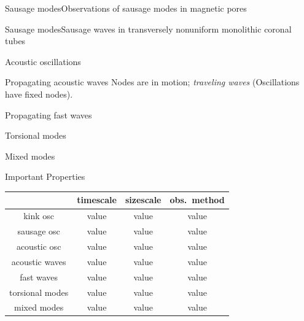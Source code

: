 \documentclass[table]{beamer}
\begin{document}
\begin{frame}{Sausage modes}{Observations of sausage modes in magnetic pores}
\end{frame}%
\begin{frame}{Sausage modes}{Sausage waves in transversely nonuniform
    monolithic coronal tubes}
\end{frame}%
\begin{frame}{Acoustic oscillations}
\end{frame}%
\begin{frame}{Propagating acoustic waves}
    Nodes are in motion; \emph{traveling waves}
    (Oscillations have fixed nodes).
\end{frame}%
\begin{frame}{Propagating fast waves}
\end{frame}%
\begin{frame}{Torsional modes}
\end{frame}%
\begin{frame}{Mixed modes}
\end{frame}%
\begin{frame}{Important Properties}
    \begin{center}
        \begin{tabular}{c|c|c|c|}
            \cline{2-4} & \textbf{timescale} & \textbf{sizescale} &
                \textbf{obs.\ method}\\
            \hline \multicolumn{0}{|c|}{kink osc} & value & value & value\\
            \hline \multicolumn{0}{|c|}{sausage osc} & value & value & value\\
            \hline \multicolumn{0}{|c|}{acoustic osc} & value & value & value\\
            \hline \multicolumn{0}{|c|}{acoustic waves} & value & value & value\\
            \hline \multicolumn{0}{|c|}{fast waves} & value & value & value\\
            \hline \multicolumn{0}{|c|}{torsional modes} & value & value & value\\
            \hline \multicolumn{0}{|c|}{mixed modes} & value & value & value\\
            \hline
        \end{tabular}
    \end{center}
\end{frame}%
\end{document}
